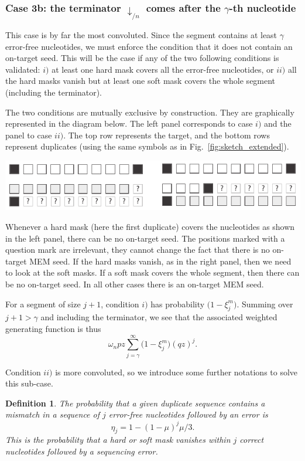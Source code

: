\documentclass{article}
\newtheorem{definition}{Definition}
\newenvironment{inset}
{\vspace{0.5\baselineskip}\begin{center}}
{\end{center}\vspace{0.5\baselineskip}}
\begin{document}
\subsubsection*{Case 3b: the terminator $\downarrow_{/n}$ comes after the
$\gamma$-th nucleotide}

This case is by far the most convoluted. Since the segment contains at
least $\gamma$ error-free nucleotides, we must enforce the condition that
it does not contain an on-target seed. This will be the case if any of the
two following conditions is validated: $i)$ at least one hard mask covers
all the error-free nucleotides, or $ii)$ all the hard masks vanish but at
least one soft mask covers the whole segment (including the terminator).

The two conditions are mutually exclusive by construction. They are
graphically represented in the diagram below. The left panel corresponds
to case $i)$ and the panel to case $ii)$. The top row represents the
target, and the bottom rows represent duplicates (using the same
symbols as in Fig.~\ref{fig:sketch_extended}).
\begin{inset}
\includegraphics{masks.pdf}
\end{inset}

Whenever a hard mask (here the first duplicate) covers the nucleotides as
shown in the left panel, there can be no on-target seed. The positions
marked with a question mark are irrelevant, they cannot change the fact
that there is no on-target MEM seed. If the hard masks vanish, as in the
right panel, then we need to look at the soft masks. If a soft mask covers
the whole segment, then there can be no on-target seed. In all other cases
there is an on-target MEM seed.

For a segment of size $j+1$, condition $i)$ has probability $\big(1 -
\xi_j^m \big)$. Summing over $j+1 > \gamma$ and including the terminator,
we see that the associated weighted generating function is thus
\begin{equation*}
\omega_n pz \sum_{j=\gamma}^\infty \Big(1 - \xi_j^m \Big) (qz)^j.
\end{equation*}

Condition $ii)$ is more convoluted, so we introduce some further
notations to solve this sub-case.
\begin{definition}
The probability that a given duplicate sequence contains a mismatch in a
sequence of $j$ error-free nucleotides followed by an error is
\begin{equation}
\label{eq:eta}
\eta_j = 1-(1-\mu)^j\mu/3.
\end{equation}
This is the probability that a hard or soft mask vanishes within $j$
correct nucleotides followed by a sequencing error.
\end{definition}
\end{document}
